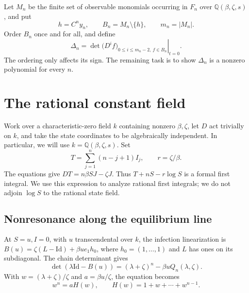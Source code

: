 \documentclass[11pt,a4paper]{article}
\newcommand{\Q}{\mathbb{Q}}
\begin{document}
Let $M_n$ be the finite set of observable monomials occurring in $F_n$ over $\Q(\beta,\zeta,s)$, and put
\begin{equation}
 h=C^ny_n,\qquad B_n=M_n\setminus\{h\},\qquad m_n=|M_n|.
\end{equation}
Order $B_n$ once and for all, and define
\begin{equation}\label{eq:Delta}
 \Delta_n=\left.\det\bigl(D^i f\bigr)_{0\leq i\leq m_n-2,\ f\in B_n}\right|_{t=0}.
\end{equation}
The ordering only affects its sign. The remaining task is to show $\Delta_n$ is a nonzero polynomial for every $n$.

\section{The rational constant field}
Work over a characteristic-zero field $k$ containing nonzero $\beta,\zeta$, let $D$ act trivially on $k$, and take the state coordinates to be algebraically independent. In particular, we will use $k=\Q(\beta,\zeta,s)$. Set
\begin{equation}
 T=\sum_{j=1}^n(n-j+1)I_j,\qquad r=\zeta/\beta.
\end{equation}
The equations give $DT=n\beta SJ-\zeta J$. Thus $T+nS-r\log S$ is a formal first integral. We use this expression to analyze rational first integrals; we do not adjoin $\log S$ to the rational state field.

\subsection{Nonresonance along the equilibrium line}
At $S=u,I=0$, with $u$ transcendental over $k$, the infection linearization is
$B(u)=\zeta(L-\mathrm{Id})+\beta u e_1h_0$,
where $h_0=(1,\ldots,1)$ and $L$ has ones on its subdiagonal. The chain determinant gives
\begin{equation}
 \det(\lambda\mathrm{Id}-B(u))=(\lambda+\zeta)^n-\beta u Q_n(\lambda,\zeta).
\end{equation}
With $w=(\lambda+\zeta)/\zeta$ and $a=\beta u/\zeta$, the equation becomes
\begin{equation}\label{eq:roots}
 w^n=aH(w),\qquad H(w)=1+w+\cdots+w^{n-1}.
\end{equation}
\end{document}
